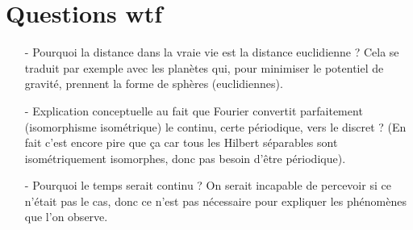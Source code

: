 \documentclass[11pt,a4paper]{article}
\begin{document}
\section{Questions wtf}
\begin{itemize}
\item[-] Pourquoi la distance dans la vraie vie est la distance euclidienne ? Cela se traduit par exemple avec les planètes qui, pour minimiser le potentiel de gravité, prennent la forme de sphères (euclidiennes). \\
\item[-] Explication conceptuelle au fait que Fourier convertit parfaitement (isomorphisme isométrique) le continu, certe périodique, vers le discret ? (En fait c'est encore pire que ça car tous les Hilbert séparables sont isométriquement isomorphes, donc pas besoin d'être périodique).
\item[-] Pourquoi le temps serait continu ? On serait incapable de percevoir si ce n’était pas le cas, donc ce n’est pas nécessaire pour expliquer les phénomènes que l’on observe. 
\end{itemize}
\end{document}
